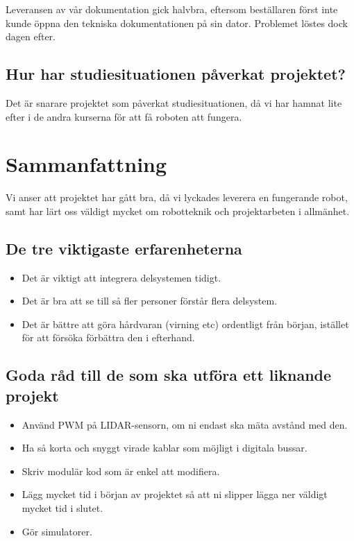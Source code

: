 \documentclass[a4paper,titlepage,12pt]{article}
\begin{document}
    Leveransen av vår dokumentation gick halvbra, eftersom beställaren först
    inte kunde öppna den tekniska dokumentationen på sin dator. Problemet
    löstes dock dagen efter.
	
	\subsection{Hur har studiesituationen påverkat projektet?}
    Det är snarare projektet som påverkat studiesituationen, då vi har hamnat
    lite efter i de andra kurserna för att få roboten att fungera.
	
	\section{Sammanfattning}
    Vi anser att projektet har gått bra, då vi lyckades leverera en fungerande
    robot, samt har lärt oss väldigt mycket om robotteknik och projektarbeten i
    allmänhet.
	
	\subsection{De tre viktigaste erfarenheterna}
    \begin{itemize}
        \item Det är viktigt att integrera delsystemen tidigt.
        \item Det är bra att se till så fler personer förstår flera delsystem.
        \item Det är bättre att göra hårdvaran (virning etc) ordentligt från början, istället
            för att försöka förbättra den i efterhand.
    \end{itemize}
	
	\subsection{Goda råd till de som ska utföra ett liknande projekt}
    \begin{itemize}
        \item Använd PWM på LIDAR-sensorn, om ni endast ska mäta avstånd med
            den.
        \item Ha så korta och snyggt virade kablar som möjligt i digitala
            bussar.
        \item Skriv modulär kod som är enkel att modifiera.
        \item Lägg mycket tid i början av projektet så att ni slipper lägga ner
            väldigt mycket tid i slutet.
        \item Gör simulatorer.
    \end{itemize}

	
\end{document}
